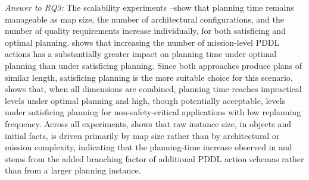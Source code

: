 \emph{Answer to RQ3:} The scalability experiments \Sone--\Sthree show that planning time remains manageable as map size, the number of architectural configurations, and the number of quality requirements increase individually, for both satisficing and optimal planning. \Sfour shows that increasing the number of mission-level PDDL actions has a substantially greater impact on planning time under optimal planning than under satisficing planning. Since both approaches produce plans of similar length, satisficing planning is the more suitable choice for this scenario. \Sfive shows that, when all dimensions are combined, planning time reaches impractical levels under optimal planning and high, though potentially acceptable, levels under satisficing planning for non-safety-critical applications with low replanning frequency. Across all experiments,  shows that raw instance size, in objects and initial facts, is driven primarily by map size rather than by architectural or mission complexity, indicating that the planning-time increase observed in \Sfour and \Sfive stems from the added branching factor of additional PDDL action schemas rather than from a larger planning instance.

